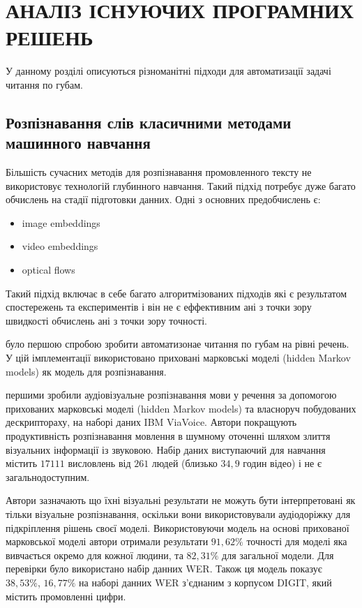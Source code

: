\chapter{АНАЛІЗ ІСНУЮЧИХ ПРОГРАМНИХ РЕШЕНЬ}

У данному розділі описуються різноманітні підходи для автоматизації задачі читання
по губам.

\section{Розпізнавання слів класичними методами машинного навчання} 
Більшість сучасних методів для розпізнавання промовленного тексту не використовує технологій глубинного навчання. Такий підхід потребує дуже багато обчислень на стадії підготовки данних. Одні з основних предобчислень є:

\begin{itemize}
    \item image embeddings
    \item video embeddings
    \item optical flows
\end{itemize}

Такий підхід включає в себе багато алгоритмізованих підходів які є результатом спостережень та експериментів і він не є еффективним ані з точки зору швидкості обчислень ані з точки зору точності. 

\cite{goldschen1997continuous} було першою спробою зробити автоматизонае читання по губам на рівні речень. У цій імплементації використовано приховані марковські моделі (hidden Markov models) як модель для розпізнавання. 

\cite{neti2000audio} першими зробили аудіовізуальне розпізнавання мови у речення за допомогою прихованих марковські моделі (hidden Markov models) та власноруч побудованих дескриптораху, на наборі даних IBM ViaVoice. Автори покращують продуктивність розпізнавання мовлення в шумному оточенні шляхом злиття візуальних інформації із звуковою. Набір даних виступаючий для навчання містить $17111$ висловлень від $261$ людей (близько $34,9$ годин відео) і не є загальнодоступним. 

Автори зазначають що їхні візуальні результати не можуть бути інтерпретовані як тільки візуальне розпізнавання, оскільки вони використовували аудіодоріжку для підкріплення рішень своєї моделі. Використовуючи модель на основі прихованої марковської моделі автори отримали результати $ 91,62\%$ точності для моделі яка вивчається окремо для кожної людини, та $ 82,31 \%$  для загальної модели. Для перевірки було використано набір данних WER. Також ця модель показує $ 38,53 \%$, $ 16,77 \%$ на наборі данних WER з'єднаним з корпусом DIGIT, який містить промовленні цифри. 

